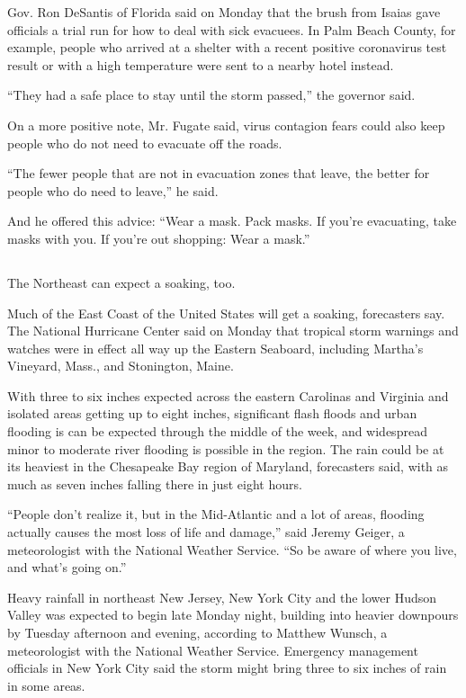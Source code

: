 Gov. Ron DeSantis of Florida said on Monday that the brush from Isaias
gave officials a trial run for how to deal with sick evacuees. In Palm
Beach County, for example, people who arrived at a shelter with a recent
positive coronavirus test result or with a high temperature were sent to
a nearby hotel instead.

``They had a safe place to stay until the storm passed,'' the governor
said.

On a more positive note, Mr. Fugate said, virus contagion fears could
also keep people who do not need to evacuate off the roads.

``The fewer people that are not in evacuation zones that leave, the
better for people who do need to leave,'' he said.

And he offered this advice: ``Wear a mask. Pack masks. If you're
evacuating, take masks with you. If you're out shopping: Wear a mask.''

\hypertarget{-4}{%
\subsection{}\label{-4}}

The Northeast can expect a soaking, too.

Much of the East Coast of the United States will get a soaking,
forecasters say. The National Hurricane Center said on Monday that
tropical storm warnings and watches were in effect all way up the
Eastern Seaboard, including Martha's Vineyard, Mass., and Stonington,
Maine.

With three to six inches expected across the eastern Carolinas and
Virginia and isolated areas getting up to eight inches, significant
flash floods and urban flooding is can be expected through the middle of
the week, and widespread minor to moderate river flooding is possible in
the region. The rain could be at its heaviest in the Chesapeake Bay
region of Maryland, forecasters said, with as much as seven inches
falling there in just eight hours.

``People don't realize it, but in the Mid-Atlantic and a lot of areas,
flooding actually causes the most loss of life and damage,'' said Jeremy
Geiger, a meteorologist with the National Weather Service. ``So be aware
of where you live, and what's going on.''

Heavy rainfall in northeast New Jersey, New York City and the lower
Hudson Valley was expected to begin late Monday night, building into
heavier downpours by Tuesday afternoon and evening, according to Matthew
Wunsch, a meteorologist with the National Weather Service. Emergency
management officials in New York City said the storm might bring three
to six inches of rain in some areas.

